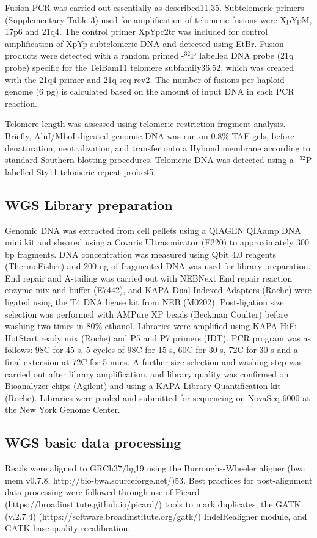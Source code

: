 \documentclass[phd,tocprelim]{cornell}
\begin{document}
Fusion PCR was carried out essentially as described11,35. Subtelomeric primers (Supplementary Table 3) used for amplification of telomeric fusions were XpYpM, 17p6 and 21q4. The control primer XpYpc2tr was included for control amplification of XpYp subtelomeric DNA and detected using EtBr. Fusion products were detected with a random primed \textalpha-$^{32}$P labelled DNA probe (21q probe) specific for the TelBam11 telomere subfamily36,52, which was created with the 21q4 primer and 21q-seq-rev2. The number of fusions per haploid genome (6 pg) is calculated based on the amount of input DNA in each PCR reaction. 

Telomere length was assessed using telomeric restriction fragment analysis. Briefly, AluI/MboI-digested genomic DNA was run on 0.8\% TAE gels, before denaturation, neutralization, and transfer onto a Hybond membrane according to standard Southern blotting procedures. Telomeric DNA was detected using a \textalpha-$^{32}$P labelled Sty11 telomeric repeat probe45.

\subsection*{WGS Library preparation}
Genomic DNA was extracted from cell pellets using a QIAGEN QIAamp DNA mini kit and sheared using a Covaris Ultrasonicator (E220) to approximately 300 bp fragments. DNA concentration was measured using Qbit 4.0 reagents (ThermoFisher) and 200 ng of fragmented DNA was used for library preparation. End repair and A-tailing was carried out with NEBNext End repair reaction enzyme mix and buffer (E7442), and KAPA Dual-Indexed Adapters (Roche) were ligated using the T4 DNA ligase kit from NEB (M0202). Post-ligation size selection was performed with AMPure XP beads (Beckman Coulter) before washing two times in 80\% ethanol. Libraries were amplified using KAPA HiFi HotStart ready mix (Roche) and P5 and P7 primers (IDT). PCR program was as follows: 98\textdegree C for 45 s, 5 cycles of 98\textdegree C for 15 s, 60\textdegree C for 30 s, 72\textdegree C for 30 s and a final extension at 72\textdegree C for 5 mins. A further size selection and washing step was carried out after library amplification, and library quality was confirmed on Bioanalyzer chips (Agilent) and using a KAPA Library Quantification kit (Roche). Libraries were pooled and submitted for sequencing on NovaSeq 6000 at the New York Genome Center. 

\subsection*{WGS basic data processing} \label{app:tc_wgs_processing}
Reads were aligned to GRCh37/hg19 using the Burroughs-Wheeler aligner (bwa mem v0.7.8, http://bio-bwa.sourceforge.net/)53. Best practices for post-alignment data processing were followed through use of Picard (https://broadinstitute.github.io/picard/) tools to mark duplicates, the GATK (v.2.7.4) (https://software.broadinstitute.org/gatk/) IndelRealigner module, and GATK base quality recalibration.
\end{document}
